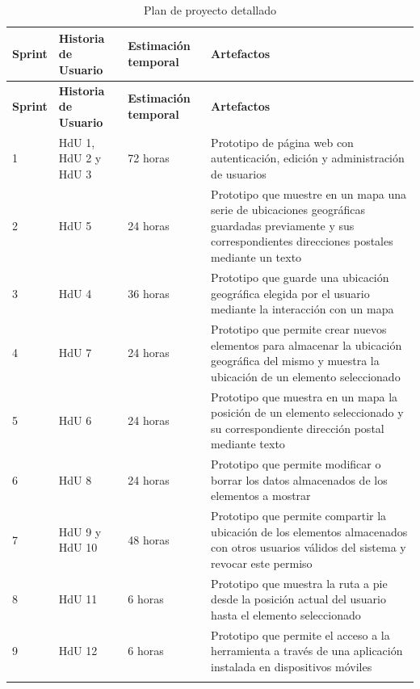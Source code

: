\begin{longtable}{p{1cm} p{4cm} p{4cm} p{6cm}}
  	\hline  	    
  	\multicolumn{1}{p{1cm}}{\cellcolor{black!30}\textbf{Sprint}} &
    \multicolumn{1}{p{4cm}}{\cellcolor{black!30}\textbf{Historia de Usuario}} & 
 	\multicolumn{1}{p{4cm}}{\cellcolor{black!30}\textbf{Estimación temporal}} &
 	\multicolumn{1}{p{6cm}}{\cellcolor{black!30}\textbf{Artefactos}}
 	\\
 	\toprule 
   	\endfirsthead
     
    \hline
  	\multicolumn{1}{p{1cm}}{\cellcolor{black!30}\textbf{Sprint}} &
    \multicolumn{1}{p{4cm}}{\cellcolor{black!30}\textbf{Historia de Usuario}} & 
 	\multicolumn{1}{p{4cm}}{\cellcolor{black!30}\textbf{Estimación temporal}} &
 	\multicolumn{1}{p{6cm}}{\cellcolor{black!30}\textbf{Artefactos}}
 	\\	 
 	\toprule
 	\endhead

	\rowcolor{gray!25}
	1	& HdU 1, HdU 2 y HdU 3	&	72 horas	&	Prototipo de página web con autenticación, edición y administración de usuarios \\ 
	2	& HdU 5					&	24 horas	&	Prototipo que muestre en un mapa una serie de ubicaciones geográficas guardadas previamente y sus correspondientes direcciones postales mediante un texto \\
	\rowcolor{gray!25}
	3	& HdU 4					&	36 horas	&	Prototipo que guarde una ubicación geográfica elegida por el usuario mediante la interacción con un mapa \\
	4	& HdU 7					&	24 horas	&	Prototipo que permite crear nuevos elementos para almacenar la ubicación geográfica del mismo y muestra la ubicación de un elemento seleccionado \\
	\rowcolor{gray!25}
	5	& HdU 6					& 	24 horas	& 	Prototipo que muestra en un mapa la posición de un elemento seleccionado y su correspondiente dirección postal mediante texto\\
	6	& HdU 8					&	24 horas	&	Prototipo que permite modificar o borrar los datos almacenados de los elementos a mostrar \\
	\rowcolor{gray!25}
	7	& HdU 9 y HdU 10		&	48 horas	&	Prototipo que permite compartir la ubicación de los elementos almacenados con otros usuarios válidos del sistema y revocar este permiso \\
	8	& HdU 11				&	6 horas		&	Prototipo que muestra la ruta a pie desde la posición actual del usuario hasta el elemento seleccionado \\
	\rowcolor{gray!25}
	9	& HdU 12				&	6 horas		&	Prototipo que permite el acceso a la herramienta a través de una aplicación instalada en dispositivos móviles \\
	\hline
	\caption{Plan de proyecto detallado}
	\label{tab:plan_proyecto}
\end{longtable}


